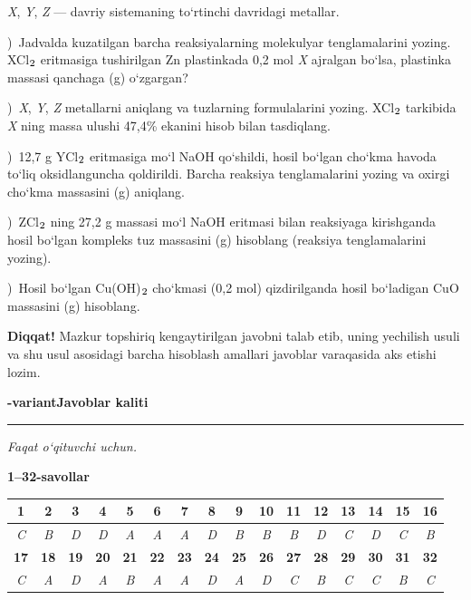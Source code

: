 \documentclass[11pt,a4paper]{article}
\renewcommand{\textsubscript}[1]{\ensuremath{_{\text{\fontsize{8}{8}\selectfont #1}}}}
\newcommand{\qsep}{\par\vspace{13pt}}
\newcommand{\diqqat}[1]{\par\smallskip\noindent\textbf{Diqqat!} #1\par\medskip}
\begin{document}
\textit{X}, \textit{Y}, \textit{Z} --- davriy sistemaning to`rtinchi davridagi metallar.\par
{})\ Jadvalda kuzatilgan barcha reaksiyalarning molekulyar tenglamalarini yozing. XCl\textsubscript{2} eritmasiga tushirilgan Zn plastinkada 0,2 mol \textit{X} ajralgan bo`lsa, plastinka massasi qanchaga (g) o`zgargan?\par
{})\ \textit{X}, \textit{Y}, \textit{Z} metallarni aniqlang va tuzlarning formulalarini yozing. XCl\textsubscript{2} tarkibida \textit{X} ning massa ulushi 47,4\% ekanini hisob bilan tasdiqlang.\par
{})\ 12,7 g YCl\textsubscript{2} eritmasiga mo`l NaOH qo`shildi, hosil bo`lgan cho`kma havoda to`liq oksidlanguncha qoldirildi. Barcha reaksiya tenglamalarini yozing va oxirgi cho`kma massasini (g) aniqlang.\par
{})\ ZCl\textsubscript{2} ning 27,2 g massasi mo`l NaOH eritmasi bilan reaksiyaga kirishganda hosil bo`lgan kompleks tuz massasini (g) hisoblang (reaksiya tenglamalarini yozing).\par
{})\ Hosil bo`lgan Cu(OH)\textsubscript{2} cho`kmasi (0,2 mol) qizdirilganda hosil bo`ladigan CuO massasini (g) hisoblang.\par
\diqqat{Mazkur topshiriq kengaytirilgan javobni talab etib, uning yechilish usuli va shu usul asosidagi barcha hisoblash amallari javoblar varaqasida aks etishi lozim.}\qsep
\newpage
\noindent\textbf{\fontsize{13}{15}-variant}\hfill \textbf{Javoblar kaliti}\par\smallskip\hrule\smallskip
\textit{Faqat o`qituvchi uchun.}\par\medskip
\noindent\textbf{1--32-savollar}\par\smallskip
\noindent\begin{tabular}{|c|c|c|c|c|c|c|c|c|c|c|c|c|c|c|c|}\hline
\textbf{1} & \textbf{2} & \textbf{3} & \textbf{4} & \textbf{5} & \textbf{6} & \textbf{7} & \textbf{8} & \textbf{9} & \textbf{10} & \textbf{11} & \textbf{12} & \textbf{13} & \textbf{14} & \textbf{15} & \textbf{16}\\\hline
\textsl{C} & \textsl{B} & \textsl{D} & \textsl{D} & \textsl{A} & \textsl{A} & \textsl{A} & \textsl{D} & \textsl{B} & \textsl{B} & \textsl{B} & \textsl{D} & \textsl{C} & \textsl{D} & \textsl{C} & \textsl{B}\\\hline
\textbf{17} & \textbf{18} & \textbf{19} & \textbf{20} & \textbf{21} & \textbf{22} & \textbf{23} & \textbf{24} & \textbf{25} & \textbf{26} & \textbf{27} & \textbf{28} & \textbf{29} & \textbf{30} & \textbf{31} & \textbf{32}\\\hline
\textsl{C} & \textsl{A} & \textsl{D} & \textsl{A} & \textsl{B} & \textsl{A} & \textsl{A} & \textsl{D} & \textsl{A} & \textsl{D} & \textsl{C} & \textsl{B} & \textsl{C} & \textsl{C} & \textsl{B} & \textsl{C}\\\hline
\end{tabular}\par\medskip
\end{document}
